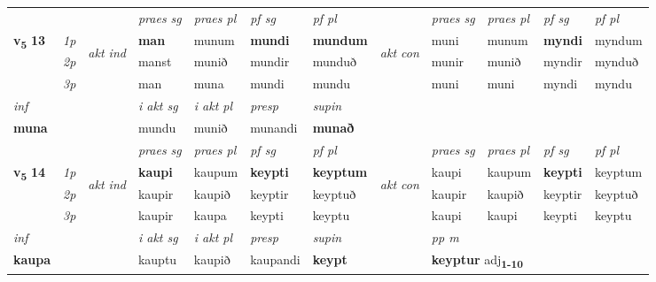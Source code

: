 \begin{longtable}[l]{X>{\footnotesize\itshape}llXXXXlXXXX}
\midrule

 & &   & \textit{praes sg}  & \textit{praes pl}    & \textit{ pf sg} & \textit{pf pl} & & \textit{praes sg}  & \textit{praes pl}    & \textit{pf sg} & \textit{pf pl }  \\ \cmidrule{4-7} \cmidrule{9-12}
 \multirow{2}{*}{{{\textbf{v{\textsubscript{5}}} \Large{\textbf{13}}}}}  & 1p & \multirow{3}{*}{\begin{turn}{90}\textit{akt ind}\end{turn}} & \textbf{man} & munum & \textbf{mundi} & \textbf{mundum} & \multirow{3}{*}{\begin{turn}{90}\textit{akt con}\end{turn}} &muni & munum & \textbf{myndi} & myndum\\*
 & 2p &  &  manst  & munið & mundir & munduð & & munir & munið & myndir & mynduð \\*
 & 3p &  & man & muna & mundi & mundu & & muni & muni& myndi & myndu \\*
\cmidrule{4-7} \cmidrule{9-12}

   {\textit{inf}} & &  & \textit{i akt sg} & \textit{i akt pl}   & \textit{presp} & \textit{supin}   \\*
  {\textbf{muna}} & && mundu  & munið   & munandi &  \textbf{munað}   \\*

\midrule

 & &   & \textit{praes sg}  & \textit{praes pl}    & \textit{ pf sg} & \textit{pf pl} & & \textit{praes sg}  & \textit{praes pl}    & \textit{pf sg} & \textit{pf pl }  \\ \cmidrule{4-7} \cmidrule{9-12}
 \multirow{2}{*}{{{\textbf{v{\textsubscript{5}}} \Large{\textbf{14}}}}}  & 1p & \multirow{3}{*}{\begin{turn}{90}\textit{akt ind}\end{turn}} & \textbf{kaupi} & kaupum & \textbf{keypti} & \textbf{keyptum} & \multirow{3}{*}{\begin{turn}{90}\textit{akt con}\end{turn}} &kaupi & kaupum & \textbf{keypti} & keyptum\\*
 & 2p &  &  kaupir  & kaupið & keyptir & keyptuð & & kaupir & kaupið & keyptir & keyptuð \\*
 & 3p &  & kaupir & kaupa & keypti & keyptu & & kaupi & kaupi& keypti & keyptu \\*
\cmidrule{4-7} \cmidrule{9-12}

   {\textit{inf}} & &  & \textit{i akt sg} & \textit{i akt pl}   & \textit{presp} & \textit{supin}  && \textit{pp m} \\*
  {\textbf{kaupa}} & && kauptu  & kaupið   & kaupandi &  \textbf{keypt}  && \multicolumn{2}{l}{\textbf{keyptur} adj\textbf{\textsubscript{1-10}}} \\*


\end{longtable}
